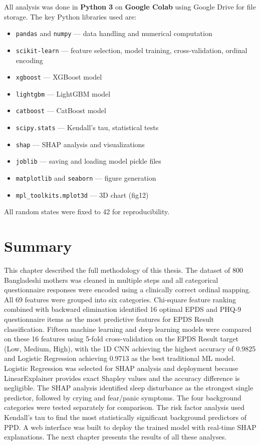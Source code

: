 All analysis was done in \textbf{Python 3} on \textbf{Google Colab} using Google Drive for file storage. The key Python libraries used are:

\begin{itemize}
    \item \texttt{pandas} and \texttt{numpy} --- data handling and numerical computation
    \item \texttt{scikit-learn} --- feature selection, model training, cross-validation, ordinal encoding
    \item \texttt{xgboost} --- XGBoost model
    \item \texttt{lightgbm} --- LightGBM model
    \item \texttt{catboost} --- CatBoost model
    \item \texttt{scipy.stats} --- Kendall's tau, statistical tests
    \item \texttt{shap} --- SHAP analysis and visualizations
    \item \texttt{joblib} --- saving and loading model pickle files
    \item \texttt{matplotlib} and \texttt{seaborn} --- figure generation
    \item \texttt{mpl\_toolkits.mplot3d} --- 3D chart (fig12)
\end{itemize}

All random states were fixed to 42 for reproducibility.

\section{Summary}
\label{ch3-sec-summary}

This chapter described the full methodology of this thesis. The dataset of 800 Bangladeshi mothers was cleaned in multiple steps and all categorical questionnaire responses were encoded using a clinically correct ordinal mapping. All 69 features were grouped into six categories. Chi-square feature ranking combined with backward elimination identified 16 optimal EPDS and PHQ-9 questionnaire items as the most predictive features for EPDS Result classification. Fifteen machine learning and deep learning models were compared on these 16 features using 5-fold cross-validation on the EPDS Result target (Low, Medium, High), with the 1D CNN achieving the highest accuracy of 0.9825 and Logistic Regression achieving 0.9713 as the best traditional ML model. Logistic Regression was selected for SHAP analysis and deployment because LinearExplainer provides exact Shapley values and the accuracy difference is negligible. The SHAP analysis identified sleep disturbance as the strongest single predictor, followed by crying and fear/panic symptoms. The four background categories were tested separately for comparison. The risk factor analysis used Kendall's tau to find the most statistically significant background predictors of PPD. A web interface was built to deploy the trained model with real-time SHAP explanations. The next chapter presents the results of all these analyses.
